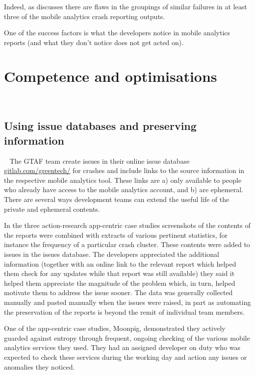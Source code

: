 Indeed, as  discusses there are flaws in the groupings of similar failures in at least three of the mobile analytics crash reporting outputs.

One of the success factors is what the developers notice in mobile analytics reports (and what they don't notice does not get acted on).


\section{Competence and optimisations}~\label{aiu-competence-and-optimisations-section}

\subsection{Using issue databases and preserving information}~\label{aiu-using-issue-databases-and-preserving-information-topics}
The GTAF team create issues in their online issue database \href{https://gitlab.com/greentech/}{gitlab.com/greentech/} for crashes and include links to the source information in the respective mobile analytics tool. These links are a) only available to people who already have access to the mobile analytics account, and b) are ephemeral. There are several ways development teams can extend the useful life of the private and ephemeral contents. 

In the three action-research app-centric case studies screenshots of the contents of the reports were combined with extracts of various pertinent statistics, for instance the frequency of a particular crash cluster. These contents were added to issues in the issues database. The developers appreciated the additional information (together with an online link to the relevant report which helped them check for any updates while that report was still available) they said it helped them appreciate the magnitude of the problem which, in turn, helped motivate them to address the issue sooner. The data was generally collected manually and pasted manually when the issues were raised, in part as automating the preservation of the reports is beyond the remit of individual team members.

One of the app-centric case studies, Moonpig, demonstrated they actively guarded against entropy through frequent, ongoing checking of the various mobile analytics services they used. They had an assigned developer on duty who was expected to check these services during the working day and action any issues or anomalies they noticed.

